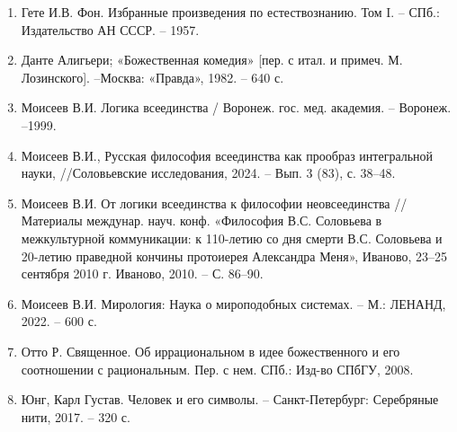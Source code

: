 \begin{enumerate}
	\item Гете И.В. Фон. Избранные произведения по естествознанию. Том I. – СПб.: Издательство АН СССР. – 1957.
	\item Данте Алигьери; «Божественная комедия» [пер. с итал. и примеч. М. Лозинского]. –Москва: «Правда», 1982. – 640 с.
	\item Моисеев В.И. Логика всеединства / Воронеж. гос. мед. академия. – Воронеж. –1999.
	\item Моисеев В.И., Русская философия всеединства как прообраз интегральной науки, //Соловьевские исследования, 2024. – Вып. 3 (83), с. 38–48.
	\item Моисеев В.И. От логики всеединства к философии неовсеединства // Материалы междунар. науч. конф. «Философия В.С. Соловьева в межкультурной коммуникации: к 110-летию со дня смерти В.С. Соловьева и 20-летию праведной кончины протоиерея Александра Меня», Иваново, 23–25 сентября 2010 г. Иваново, 2010. – С. 86–90.
	\item Моисеев В.И. Мирология: Наука о мироподобных системах. – М.: ЛЕНАНД, 2022. – 600 с.
	\item Отто Р. Священное. Об иррациональном в идее божественного и его соотношении с рациональным. Пер. с нем. СПб.: Изд-во СПбГУ, 2008.
	\item Юнг, Карл Густав. Человек и его символы. – Санкт-Петербург: Серебряные нити, 2017. – 320 с.
\end{enumerate}
\fi
